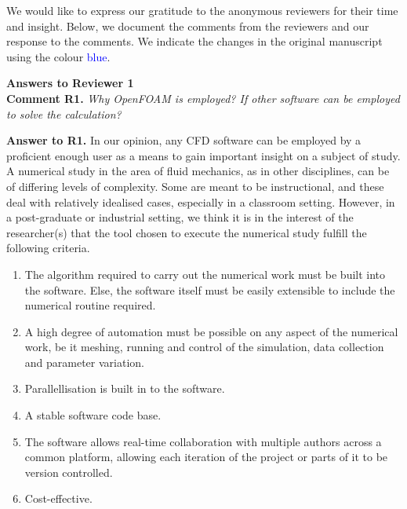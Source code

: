 \documentclass[10pt]{article}
\newcounter{question}
\newcommand{\name}{00}
\newcommand{\question}[1]{\refstepcounter{question} \noindent \textbf{Comment \name.\thequestion}\vskip 0.25cm \noindent \emph{#1}\\}
\newcommand{\answer}[1]{\noindent \textbf{Answer to \name.\thequestion}\vskip 0.25cm \noindent #1 \mbox{}\\}
\newcommand{\newperson}[2]{\renewcommand{\name}{#2} \setcounter{question}{0} \noindent \textbf{\large Answers to #1} \\}
\begin{document}
\noindent We would like to express our gratitude to the anonymous reviewers for their time and insight. Below, we document the comments from the reviewers and our response to the comments. We indicate the changes in the original manuscript using the colour \textcolor{blue}{blue}.

\vspace{1cm}

% 
% 
\newperson{Reviewer 1}{R1}

\question{Why OpenFOAM is employed? If other software can be employed to solve the calculation?} \label{quest:whyOF}

\answer{
  In our opinion, any CFD software can be employed by a proficient enough user as a means to gain important insight on a subject of study. A numerical study in the area of fluid mechanics, as in other disciplines, can be of differing levels of complexity. Some are meant to be instructional, and these deal with relatively idealised cases, especially in a classroom setting. However, in a post-graduate or industrial setting, we think it is in the interest of the researcher(s) that the tool chosen to execute the numerical study fulfill the following criteria.

    \begin{enumerate}
        \item The algorithm required to carry out the numerical work must be built into the software. Else, the software itself must be easily extensible to include the numerical routine required. \label{enum:extensible}
        \item A high degree of automation must be possible on any aspect of the numerical work, be it meshing, running and control of the simulation, data collection and parameter variation. \label{enum:automation}
        \item Parallellisation is built in to the software. \label{enum:parallellisation}
        \item A stable software code base. \label{enum:stability}
        \item The software allows real-time collaboration with multiple authors across a common platform, allowing each iteration of the project or parts of it to be version controlled. \label{enum:collaboration}
        \item Cost-effective. \label{enum:cost}
    \end{enumerate}

}
\end{document}
